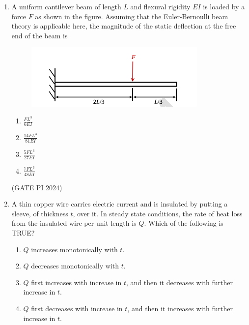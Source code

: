\documentclass[journal,12pt,onecolumn]{IEEEtran}
\theoremstyle{remark}
\begin{document}
\begin{enumerate}
\begin{multicols}{4}
\begin{enumerate}
    \item $-100\pi$
    \item $-800\pi$
    \item $-400\pi$
    \item $400\pi$
\end{enumerate}
\end{multicols}

\hfill (GATE PI 2024)

\item A uniform cantilever beam of length $L$ and flexural rigidity $EI$ is loaded by a force $F$ as shown in the figure. Assuming that the Euler-Bernoulli beam theory is applicable here, the magnitude of the static deflection at the free end of the beam is

\begin{figure}[H]
\centering
\includegraphics[width=0.5\columnwidth]{fig5.png}
\caption{}
\end{figure}

\begin{multicols}{4}
\begin{enumerate}
    \item $\frac{FL^3}{6EI}$
    \item $ \frac{14FL^3}{81EI}$
    \item $\frac{5FL^3}{27EI}$
    \item $ \frac{7FL^3}{48EI}$
\end{enumerate}
\end{multicols}

\hfill (GATE PI 2024)

\item A thin copper wire carries electric current and is insulated by putting a sleeve, of thickness $t$, over it. In steady state conditions, the rate of heat loss from the insulated wire per unit length is $Q$. Which of the following is TRUE?

\begin{enumerate}
    \item $Q$ increases monotonically with $t$.
    \item $Q$ decreases monotonically with $t$.
    \item $Q$ first increases with increase in $t$, and then it decreases with further increase in $t$.
    \item $Q$ first decreases with increase in $t$, and then it increases with further increase in $t$.
\end{enumerate}


\end{enumerate}
\end{document}
